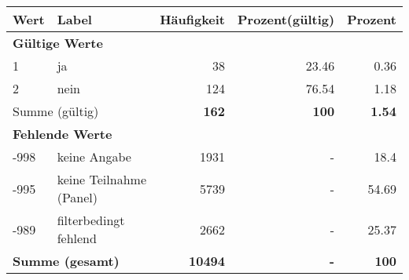      \begin{longtable}{lXrrr}
     \toprule
     \textbf{Wert} & \textbf{Label} & \textbf{Häufigkeit} & \textbf{Prozent(gültig)} & \textbf{Prozent} \\
     \endhead
     \midrule
     \multicolumn{5}{l}{\textbf{Gültige Werte}}\\

     1 &
     \multicolumn{1}{X}{ ja   } &


       \num{38} &
       \num[round-mode=places,round-precision=2]{23.46} &
         \num[round-mode=places,round-precision=2]{0.36} \\

     2 &
     \multicolumn{1}{X}{ nein   } &


       \num{124} &
       \num[round-mode=places,round-precision=2]{76.54} &
         \num[round-mode=places,round-precision=2]{1.18} \\
     \midrule
     \multicolumn{2}{l}{Summe (gültig)} &
       \textbf{\num{162}} &
     \textbf{\num{100}} &
       \textbf{\num[round-mode=places,round-precision=2]{1.54}} \\
     \multicolumn{5}{l}{\textbf{Fehlende Werte}}\\
       -998 &
       keine Angabe &
         \num{1931} &
        - &
         \num[round-mode=places,round-precision=2]{18.4} \\
       -995 &
       keine Teilnahme (Panel) &
         \num{5739} &
        - &
         \num[round-mode=places,round-precision=2]{54.69} \\
       -989 &
       filterbedingt fehlend &
         \num{2662} &
        - &
         \num[round-mode=places,round-precision=2]{25.37} \\
     \midrule
     \multicolumn{2}{l}{\textbf{Summe (gesamt)}} &
          \textbf{\num{10494}} &
        \textbf{-} &
        \textbf{\num{100}} \\
     \bottomrule
     \end{longtable}
     
